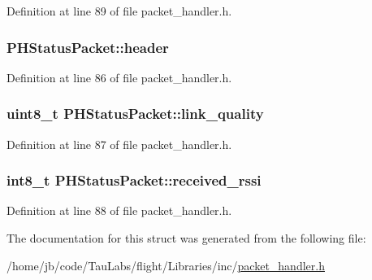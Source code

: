 \-Definition at line 89 of file packet\-\_\-handler.\-h.

\hypertarget{struct_p_h_status_packet_a01617aa2bca7a093aa2dd7a2e7edc47a}{
\subsubsection[{header}]{ {\bf \-P\-H\-Status\-Packet\-::header}}}\label{struct_p_h_status_packet_a01617aa2bca7a093aa2dd7a2e7edc47a}


\-Definition at line 86 of file packet\-\_\-handler.\-h.

\hypertarget{struct_p_h_status_packet_ac78a8f872dbb6ece46016b5fdc901037}{
\subsubsection[{link\-\_\-quality}]{\setlength{\rightskip}{0pt plus 5cm}uint8\-\_\-t {\bf \-P\-H\-Status\-Packet\-::link\-\_\-quality}}}\label{struct_p_h_status_packet_ac78a8f872dbb6ece46016b5fdc901037}


\-Definition at line 87 of file packet\-\_\-handler.\-h.

\hypertarget{struct_p_h_status_packet_a8dcb964e68ef8dbed6c28e6418dc3e2e}{
\subsubsection[{received\-\_\-rssi}]{\setlength{\rightskip}{0pt plus 5cm}int8\-\_\-t {\bf \-P\-H\-Status\-Packet\-::received\-\_\-rssi}}}\label{struct_p_h_status_packet_a8dcb964e68ef8dbed6c28e6418dc3e2e}


\-Definition at line 88 of file packet\-\_\-handler.\-h.



\-The documentation for this struct was generated from the following file\-:\begin{DoxyCompactItemize}
\item 
/home/jb/code/\-Tau\-Labs/flight/\-Libraries/inc/\hyperlink{packet__handler_8h}{packet\-\_\-handler.\-h}\end{DoxyCompactItemize}
